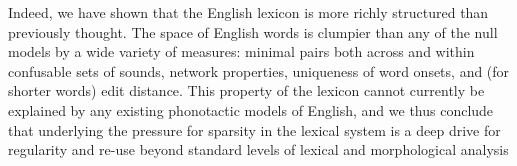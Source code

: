\documentclass{article}
\begin{document}
Indeed, we have shown that the English lexicon is more richly structured than previously thought. The space of
English words is clumpier than any of the null models by a wide variety of measures: minimal pairs both across
and within confusable sets of sounds, network properties, uniqueness of word onsets, and (for shorter words)
edit distance. This property of the lexicon cannot currently be explained by any existing phonotactic models
of English, and we thus conclude that underlying the pressure for sparsity in the lexical system is a deep
drive for regularity and re-use beyond standard levels of lexical and morphological analysis







\end{document}
